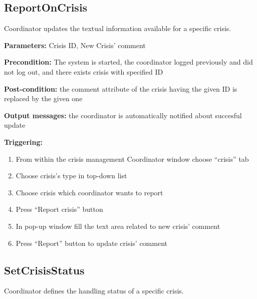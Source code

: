 \subsection{ReportOnCrisis}

Coordinator updates the textual information available for a specific crisis.

\begin{description}

\item \textbf{Parameters:} Crisis ID, New Crisis' comment
\item \textbf{Precondition:} The system is started, the coordinator logged
previously and did not log out, and there exists crisis with specified ID
\item \textbf{Post-condition:} the comment attribute of the crisis having the
given ID is replaced by the given one 
\item \textbf{Output messages:} the coordinator is automatically notified about
succesful update

\item \textbf{Triggering:}
\begin{enumerate}
\item From within the crisis management Coordinator window choose ``crisis'' tab
\item Choose crisis's type in top-down list
\item Choose crisis which coordinator wants to report
\item Press ``Report crisis'' button
\item In pop-up window fill the text area related to new crisis' comment
\item Press ``Report'' button to update crisis' comment 
\end{enumerate}

\end{description}

\subsection{SetCrisisStatus}

Coordinator defines the handling status of a specific crisis.

